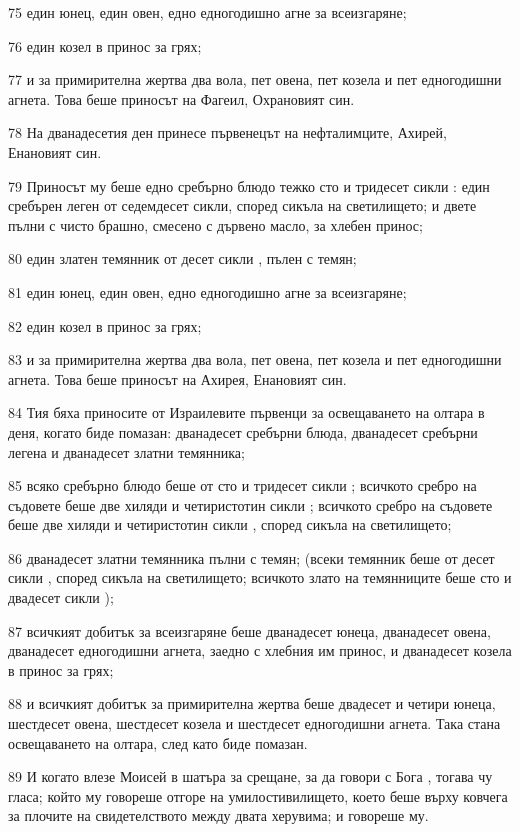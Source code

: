 \par 75 един юнец, един овен, едно едногодишно агне за всеизгаряне;
\par 76 един козел в принос за грях;
\par 77 и за примирителна жертва два вола, пет овена, пет козела и пет едногодишни агнета. Това беше приносът на Фагеил, Охрановият син.
\par 78 На дванадесетия ден принесе първенецът на нефталимците, Ахирей, Енановият син.
\par 79 Приносът му беше едно сребърно блюдо тежко сто и тридесет сикли : един сребърен леген от седемдесет сикли, според сикъла на светилището; и двете пълни с чисто брашно, смесено с дървено масло, за хлебен принос;
\par 80 един златен темянник от десет сикли , пълен с темян;
\par 81 един юнец, един овен, едно едногодишно агне за всеизгаряне;
\par 82 един козел в принос за грях;
\par 83 и за примирителна жертва два вола, пет овена, пет козела и пет едногодишни агнета. Това беше приносът на Ахирея, Енановият син.
\par 84 Тия бяха приносите от Израилевите първенци за освещаването на олтара в деня, когато биде помазан: дванадесет сребърни блюда, дванадесет сребърни легена и дванадесет златни темянника;
\par 85 всяко сребърно блюдо беше от сто и тридесет сикли ; всичкото сребро на съдовете беше две хиляди и четиристотин сикли ; всичкото сребро на съдовете беше две хиляди и четиристотин сикли , според сикъла на светилището;
\par 86 дванадесет златни темянника пълни с темян; (всеки темянник беше от десет сикли , според сикъла на светилището; всичкото злато на темянниците беше сто и двадесет сикли );
\par 87 всичкият добитък за всеизгаряне беше дванадесет юнеца, дванадесет овена, дванадесет едногодишни агнета, заедно с хлебния им принос, и дванадесет козела в принос за грях;
\par 88 и всичкият добитък за примирителна жертва беше двадесет и четири юнеца, шестдесет овена, шестдесет козела и шестдесет едногодишни агнета. Така стана освещаването на олтара, след като биде помазан.
\par 89 И когато влезе Моисей в шатъра за срещане, за да говори с Бога , тогава чу гласа; който му говореше отгоре на умилостивилището, което беше върху ковчега за плочите на свидетелството между двата херувима; и говореше му.

